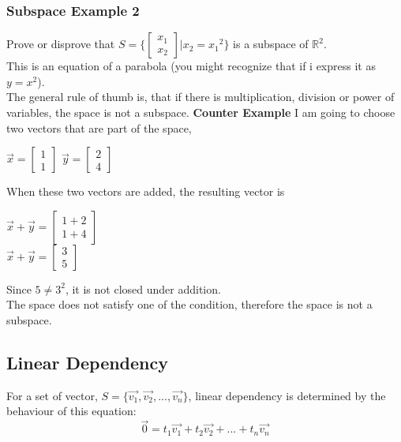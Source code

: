 \documentclass[12pt]{article}
\newcommand{\R}{\mathbb{R}}
\begin{document}
\subsubsection{Subspace Example 2}
Prove or disprove that $S=\{\begin{bmatrix}x_1\\x_2\end{bmatrix} | x_2 = {x_1}^2\}$ is a subspace of $\R^2$.\\
This is an equation of a parabola (you might recognize that if i express it as $y=x^2$).\\
The general rule of thumb is, that if there is multiplication, division or power of variables, the space is not a subspace.
\textbf{Counter Example}
I am going to choose two vectors that are part of the space,\\
\begin{centering}
$\vec{x} = \begin{bmatrix}1\\1\end{bmatrix}$
$\vec{y} = \begin{bmatrix}2\\4\end{bmatrix}$\\
\end{centering}
When these two vectors are added, the resulting vector is 
\begin{centering}
$\vec{x}+\vec{y} = \begin{bmatrix}1+2\\1+4\end{bmatrix}$\\
$\vec{x}+\vec{y} = \begin{bmatrix}3\\5\end{bmatrix}$\\
\end{centering}
Since $5\neq3^2$, it is not closed under addition.\\
The space does not satisfy one of the condition, therefore the space is not a subspace.

\subsection{Linear Dependency}
For a set of vector, $S = \{\vec{v_1},\vec{v_2},...,\vec{v_n}\}$, linear dependency is determined by the behaviour of this equation:
\begin{equation}
\label{eq:Lin}
\vec{0} = t_1\vec{v_1} + t_2\vec{v_2} + ... +t_n\vec{v_n}
\end{equation}
\end{document}
